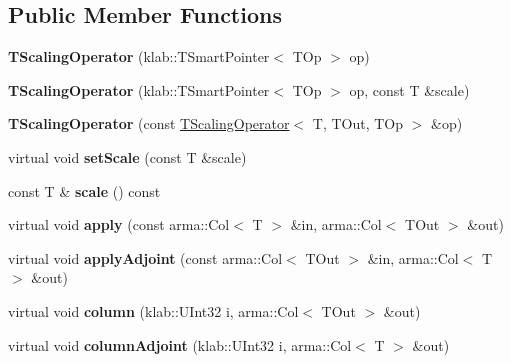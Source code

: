 \subsection*{Public Member Functions}
\begin{DoxyCompactItemize}
\item 
{\bfseries T\+Scaling\+Operator} (klab\+::\+T\+Smart\+Pointer$<$ T\+Op $>$ op)\hypertarget{classkl1p_1_1TScalingOperator_a81bbc74254b9c3ea537509417d151ca7}{}\label{classkl1p_1_1TScalingOperator_a81bbc74254b9c3ea537509417d151ca7}

\item 
{\bfseries T\+Scaling\+Operator} (klab\+::\+T\+Smart\+Pointer$<$ T\+Op $>$ op, const T \&scale)\hypertarget{classkl1p_1_1TScalingOperator_a945a40cfd8187f6400bc334d884a6dfd}{}\label{classkl1p_1_1TScalingOperator_a945a40cfd8187f6400bc334d884a6dfd}

\item 
{\bfseries T\+Scaling\+Operator} (const \hyperlink{classkl1p_1_1TScalingOperator}{T\+Scaling\+Operator}$<$ T, T\+Out, T\+Op $>$ \&op)\hypertarget{classkl1p_1_1TScalingOperator_a5851c0a8d3c5987871747e5b4f62563f}{}\label{classkl1p_1_1TScalingOperator_a5851c0a8d3c5987871747e5b4f62563f}

\item 
virtual void {\bfseries set\+Scale} (const T \&scale)\hypertarget{classkl1p_1_1TScalingOperator_acb3d393f745207a1eaa7257216655f77}{}\label{classkl1p_1_1TScalingOperator_acb3d393f745207a1eaa7257216655f77}

\item 
const T \& {\bfseries scale} () const \hypertarget{classkl1p_1_1TScalingOperator_ab31abe7ca86f8717d8b779dcafeee5e0}{}\label{classkl1p_1_1TScalingOperator_ab31abe7ca86f8717d8b779dcafeee5e0}

\item 
virtual void {\bfseries apply} (const arma\+::\+Col$<$ T $>$ \&in, arma\+::\+Col$<$ T\+Out $>$ \&out)\hypertarget{classkl1p_1_1TScalingOperator_a4d1b7c40dba3d3fe348f730e20961092}{}\label{classkl1p_1_1TScalingOperator_a4d1b7c40dba3d3fe348f730e20961092}

\item 
virtual void {\bfseries apply\+Adjoint} (const arma\+::\+Col$<$ T\+Out $>$ \&in, arma\+::\+Col$<$ T $>$ \&out)\hypertarget{classkl1p_1_1TScalingOperator_a4d5d729b4c98f7a9e934947c77587d71}{}\label{classkl1p_1_1TScalingOperator_a4d5d729b4c98f7a9e934947c77587d71}

\item 
virtual void {\bfseries column} (klab\+::\+U\+Int32 i, arma\+::\+Col$<$ T\+Out $>$ \&out)\hypertarget{classkl1p_1_1TScalingOperator_a01126935df4f059d822ac15c6f29d3ba}{}\label{classkl1p_1_1TScalingOperator_a01126935df4f059d822ac15c6f29d3ba}

\item 
virtual void {\bfseries column\+Adjoint} (klab\+::\+U\+Int32 i, arma\+::\+Col$<$ T $>$ \&out)\hypertarget{classkl1p_1_1TScalingOperator_a72698f97602f8263eed540af85f55e4b}{}\label{classkl1p_1_1TScalingOperator_a72698f97602f8263eed540af85f55e4b}

\end{DoxyCompactItemize}
